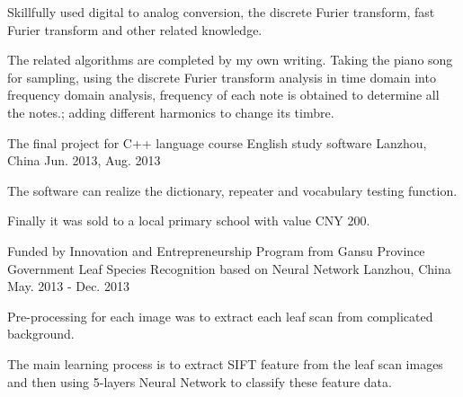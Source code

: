 \begin{cventries}
{\begin{cvitems}
        \item {Skillfully used digital to analog conversion, the discrete Furier transform, fast Furier transform and other related knowledge.}
        \item {The related algorithms are completed by my own writing. Taking the piano song for sampling, using the discrete Furier transform analysis in time domain into frequency domain analysis, frequency of each note is obtained to determine all the notes.; adding different harmonics to change its timbre.}
      \end{cvitems}
    }
  \cventry
    {The final project for C++ language course}
    {English study software}
    {Lanzhou, China}
    {Jun. 2013, Aug. 2013}
    {
      \begin{cvitems}
        \item {The software can realize the dictionary, repeater and vocabulary testing function.}
        \item {Finally it was sold to a local primary school with value CNY 200.}
      \end{cvitems}
    }
  \cventry
    {Funded by Innovation and Entrepreneurship Program from Gansu Province Government}
    {Leaf Species Recognition based on Neural Network}
    {Lanzhou, China}
    {May. 2013 - Dec. 2013}
    {
      \begin{cvitems}
        \item {Pre-processing for each image was to extract each leaf scan from complicated background.}
        \item {The main learning process is to extract SIFT feature from the leaf scan images and then using 5-layers Neural Network to classify these feature data.}
      \end{cvitems}
    }
\end{cventries}
